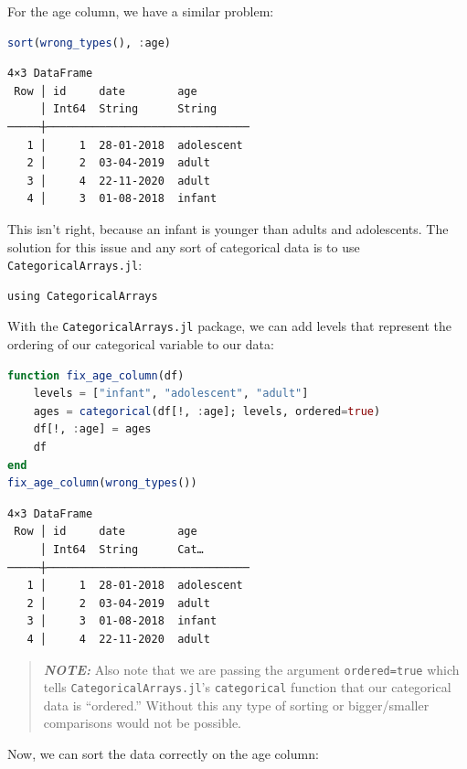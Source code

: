 \documentclass[
  notoc %
]{tufte-book}
\newcommand{\passthrough}[1]{#1}
\begin{document}
For the age column, we have a similar problem:

\begin{lstlisting}[language=Julia]
sort(wrong_types(), :age)
\end{lstlisting}

\begin{lstlisting}[language=Output]
4×3 DataFrame
 Row │ id     date        age
     │ Int64  String      String
─────┼───────────────────────────────
   1 │     1  28-01-2018  adolescent
   2 │     2  03-04-2019  adult
   3 │     4  22-11-2020  adult
   4 │     3  01-08-2018  infant
\end{lstlisting}

This isn't right, because an infant is younger than adults and
adolescents. The solution for this issue and any sort of categorical
data is to use \passthrough{\lstinline!CategoricalArrays.jl!}:

\begin{lstlisting}
using CategoricalArrays
\end{lstlisting}

With the \passthrough{\lstinline!CategoricalArrays.jl!} package, we can
add levels that represent the ordering of our categorical variable to
our data:

\begin{lstlisting}[language=Julia]
function fix_age_column(df)
    levels = ["infant", "adolescent", "adult"]
    ages = categorical(df[!, :age]; levels, ordered=true)
    df[!, :age] = ages
    df
end
fix_age_column(wrong_types())
\end{lstlisting}

\begin{lstlisting}[language=Output]
4×3 DataFrame
 Row │ id     date        age
     │ Int64  String      Cat…
─────┼───────────────────────────────
   1 │     1  28-01-2018  adolescent
   2 │     2  03-04-2019  adult
   3 │     3  01-08-2018  infant
   4 │     4  22-11-2020  adult
\end{lstlisting}

\begin{quote}
\textbf{\emph{NOTE:}} Also note that we are passing the argument
\passthrough{\lstinline!ordered=true!} which tells
\passthrough{\lstinline!CategoricalArrays.jl!}'s
\passthrough{\lstinline!categorical!} function that our categorical data
is ``ordered.'' Without this any type of sorting or bigger/smaller
comparisons would not be possible.
\end{quote}

Now, we can sort the data correctly on the age column:
\end{document}
